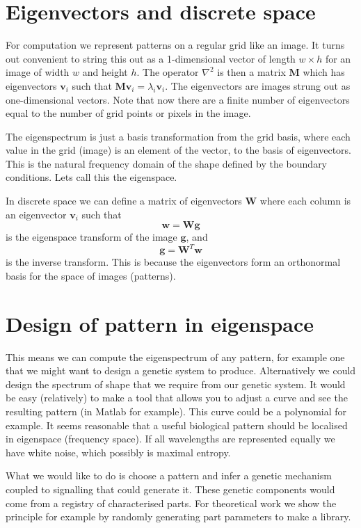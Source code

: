 \documentclass{report}
\renewcommand{\vec}[1]{\mathbf{#1}}
\newcommand{\mat}{\mathbf}
\begin{document}
\section{Eigenvectors and discrete space}
For computation we represent patterns on a regular grid like an image. It turns
out convenient to string this out as a 1-dimensional vector of length $w\times
h$ for an image of width $w$ and height $h$. The operator $\nabla^2$ is then a
matrix $\mat{M}$ which has eigenvectors $\vec{v}_i$ such that $\mat{M}\vec{v}_i
= \lambda_i \vec{v}_i$. The eigenvectors are images strung out as
one-dimensional vectors. Note that now there are a finite number of eigenvectors
equal to the number of grid points or pixels in the image.

The eigenspectrum is just a basis transformation from the grid basis, where each
value in the grid (image) is an element of the vector, to the basis of
eigenvectors. This is the natural frequency domain of the shape defined by the
boundary conditions. Lets call this the eigenspace.

In discrete space we can define a matrix of eigenvectors
$\mat{W}$ where each column is an eigenvector $\vec{v}_i$ such that
\begin{equation}
\vec{w} = \mat{W}\vec{g}
\end{equation}
is the eigenspace transform of the image $\vec{g}$, and
\begin{equation}
\vec{g} = \mat{W}^T\vec{w}
\end{equation}
is the inverse transform. This is because the eigenvectors form an orthonormal
basis for the space of images (patterns).

\section{Design of pattern in eigenspace}
This means we can compute the eigenspectrum of any pattern, for example one that
we might want to design a genetic system to produce. Alternatively we could
design the spectrum of shape that we require from our genetic system. It would
be easy (relatively) to make a tool that allows you to adjust a curve and see
the resulting pattern (in Matlab for example). This curve could be a polynomial
for example. It seems reasonable that a useful biological pattern should be
localised in eigenspace (frequency space). If all wavelengths are represented
equally we have white noise, which possibly is maximal entropy. 

What we would like to do is choose a pattern and infer a genetic mechanism
coupled to signalling that could generate it. These genetic components would
come from a registry of characterised parts. For theoretical work we show the
principle for example by randomly generating part parameters to make a library.
\end{document}
